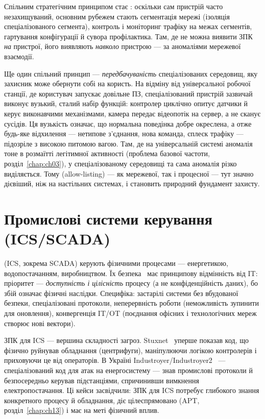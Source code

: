 Спільним стратегічним принципом стає : оскільки сам пристрій часто незахищуваний, основним рубежем стають сегментація мережі (ізоляція спеціалізованого сегмента), контроль і моніторинг трафіку на межах сегментів, гартування конфігурації й сувора профілактика. Там, де не можна виявити ЗПК \emph{на} пристрої, його виявляють \emph{навколо} пристрою --- за аномаліями мережевої взаємодії.

Ще один спільний принцип --- \emph{передбачуваність} спеціалізованих середовищ, яку захисник може обернути собі на користь. На відміну від універсальної робочої станції, де користувач запускає довільне ПЗ, спеціалізований пристрій зазвичай виконує вузький, сталий набір функцій: контролер циклічно опитує датчики й керує виконавчими механізмами, камера передає відеопотік на сервер, а не сканує сусідів. Ця вузькість означає, що нормальна поведінка добре окреслена, а отже будь-яке відхилення --- нетипове з'єднання, нова команда, сплеск трафіку --- підозріле з високою питомою вагою. Там, де на універсальній системі аномалія тоне в розмаїтті легітимної активності (проблема базової частоти, розділ~\ref{chap:ch03}), у спеціалізованому середовищі та сама аномалія різко виділяється. Тому  (allow-listing) --- як мережевої, так і процесної --- тут значно дієвіший, ніж на настільних системах, і становить природний фундамент захисту.

\section{Промислові системи керування (ICS/SCADA)}\label{sec:ch14-ics}

 (ICS, зокрема SCADA) керують фізичними процесами --- енергетикою, водопостачанням, виробництвом. Їх безпека~\cite{ch14:stouffer,ch14:iec62443} має принципову відмінність від IT: пріоритет --- \emph{доступність і цілісність} процесу (а не конфіденційність даних), бо збій означає фізичні наслідки. Специфіка: застарілі системи без вбудованої безпеки, спеціалізовані протоколи, неперервність роботи (неможливість зупинити для оновлення), конвергенція IT/OT (поєднання офісних і технологічних мереж створює нові вектори).

ЗПК для ICS --- вершина складності загроз. Stuxnet~\cite{ch14:langner} уперше показав код, що фізично руйнував обладнання (центрифуги), маніпулюючи логікою контролерів і приховуючи це від операторів. В Україні Industroyer/Industroyer2~\cite{ch14:industroyer} --- спеціалізований код для атак на енергосистему --- знав промислові протоколи й безпосередньо керував підстанціями, спричинивши вимкнення електропостачання. Ці кейси засвідчили: ЗПК для ICS потребує глибокого знання конкретного процесу й обладнання, діє цілеспрямовано (APT, розділ~\ref{chap:ch13}) і має на меті фізичний вплив.

